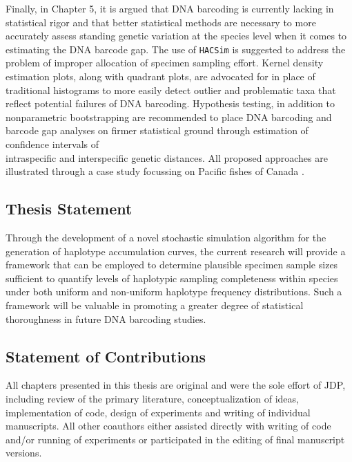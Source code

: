 \vspace{5mm}

Finally, in Chapter 5, it is argued that DNA barcoding is currently lacking in statistical rigor and that better statistical methods are necessary to more accurately assess standing genetic variation at the species level when it comes to estimating the DNA barcode gap. The use of {\tt HACSim} is suggested to address the problem of improper allocation of specimen sampling effort. Kernel density estimation plots, along with quadrant plots, are advocated for in place of traditional histograms to more easily detect outlier and problematic taxa that reflect potential failures of DNA barcoding. Hypothesis testing, in addition to \\ nonparametric bootstrapping are recommended to place DNA barcoding and barcode gap analyses on firmer statistical ground through estimation of confidence intervals of \\ intraspecific and interspecific genetic distances. All proposed approaches are illustrated through a case study focussing on Pacific fishes of Canada \cite{steinke2009dna}.

\vspace{5mm}

\subsection{Thesis Statement}

Through the development of a novel stochastic simulation algorithm for the generation of haplotype accumulation curves, the current research will provide a framework that can be employed to determine plausible specimen sample sizes sufficient to quantify levels of haplotypic sampling completeness within species under both uniform and non-uniform haplotype frequency distributions. Such a framework will be valuable in promoting a greater degree of statistical thoroughness in future DNA barcoding studies. 

\vspace{5mm}

\subsection{Statement of Contributions}
  
All chapters presented in this thesis are original and were the sole effort of JDP, \\ including review of the primary literature, conceptualization of ideas, implementation of code, design of experiments and writing of individual manuscripts. All other coauthors either assisted directly with writing of code and/or running of experiments or participated in the editing of final manuscript versions.


